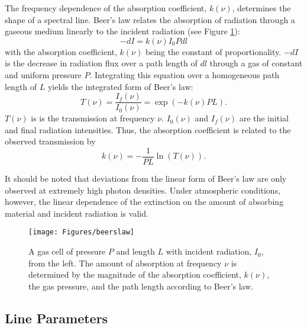 \documentclass[11pt]{article}
\begin{document}
The frequency dependence of the absorption coefficient, $k(\nu)$, 
determines the shape of a spectral line.  Beer's law relates the 
absorption of radiation through a gaseous medium linearly to the incident 
radiation (see Figure \ref{fig:beers_law}):
\begin{equation}
   -dI = k(\nu)I_{0}P dl
\label{eqn:blaw1}
\end{equation}
with the absorption coefficient, $k(\nu)$ being the constant of
proportionality.  $-dI$ is the decrease in radiation flux over a path 
length of $dl$ through a gas of constant and uniform pressure $P$.  
Integrating this equation over a homogeneous path length of $L$ yields 
the integrated form of Beer's law:
\begin{equation}
 T(\nu)=\frac{I_f(\nu)}{I_0(\nu)}=\exp\left(-k(\nu)P L\right).
\label{eqn:blaw2}
\end{equation}
$T(\nu)$ is is the transmission at frequency $\nu$. $I_{0}(\nu)$ and
$I_f(\nu)$ are the initial and final radiation intensities.  Thus, the 
absorption coefficient is related to the observed transmission by 
\begin{equation}
 k(\nu)=-\frac{1}{P L}\ln\left(T(\nu)\right).
\end{equation}

It should be noted that deviations from the linear form of Beer's law are
only observed at extremely high photon densities.  Under atmospheric
conditions, however, the linear dependence of the extinction on the amount 
of absorbing material and incident radiation is valid. 

\begin{figure}
 \begin{center}
  \texttt{[image: Figures/beerslaw]}\end{center}
  \caption[An illustration of Beer's law.]{A gas cell of pressure $P$ and 
    length $L$ with incident radiation,
    $I_{0}$, from the left.  The amount of absorption at frequency $\nu$ is
    determined by the magnitude of the absorption coefficient, $k(\nu)$,
    the gas pressure, and the path length according to Beer's law.}
  \label{fig:beers_law}
\end{figure}

\subsection{Line Parameters}\label{sec:lines}
\end{document}
